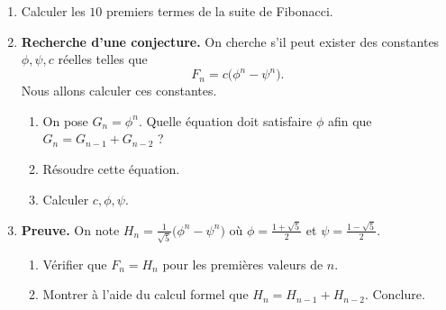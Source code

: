 \documentclass[class=report,crop=false]{standalone}
\begin{document}
\begin{tp}
\sauteligne
\begin{enumerate}
  \item Calculer les $10$ premiers termes de la suite de Fibonacci.
  \item \textbf{Recherche d'une conjecture.} On cherche s'il peut exister 
  des constantes $\phi,\psi,c$ réelles telles que
  $$F_n = c \big(\phi^n-\psi^n\big).$$
  Nous allons calculer ces constantes.
   \begin{enumerate}
    \item On pose $G_n = \phi^n$. Quelle équation doit satisfaire $\phi$
    afin que $G_{n} = G_{n-1}+G_{n-2}$ ?
    \item Résoudre cette équation.
    \item Calculer $c,\phi,\psi$.
  \end{enumerate}
  
  \item \textbf{Preuve.} On note $H_n = \frac{1}{\sqrt{5}}  \big(\phi^n-\psi^n\big)$
  où $\phi = \frac{1+\sqrt5}{2}$ et $\psi=\frac{1-\sqrt5}{2}$.
  \begin{enumerate}
    \item Vérifier que $F_n=H_n$ pour les premières valeurs de $n$.
    \item Montrer à l'aide du calcul formel que $H_{n} = H_{n-1}+H_{n-2}$. Conclure.
  \end{enumerate}  
\end{enumerate}
\end{tp}
\end{document}

